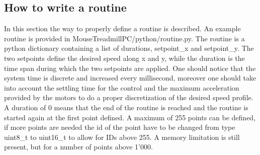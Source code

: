 \documentclass[12pt,a4paper, twoside]{article}
\begin{document}
\subsection{How to write a routine}
In this section the way to properly define a routine is described. 
An example routine is provided in MouseTreadmillPC/python/routine.py. The routine is a python dictionary containing a list of durations, setpoint\_x and setpoint\_y. The two setpoints define the desired speed along x and y, while the duration is the time span during which the two setpoints are applied. One should notice that the system time is discrete and increased every millisecond, moreover one should take into account the settling time for the control and the maximum acceleration provided by the motors to do a proper discretization of the desired speed profile.\\
A duration of 0 means that the end of the routine is reached and the routine is started again at the first point defined. A maximum of 255 points can be defined, if more points are needed the id of the point have to be changed from type uint8\_t to uint16\_t to allow for IDs above 255. A memory limitation is still present, but for a number of points above 1'000.
\end{document}
